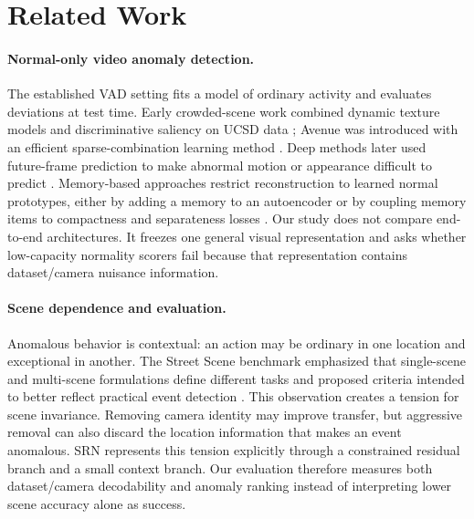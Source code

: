 \section{Related Work}

\paragraph{Normal-only video anomaly detection.}
The established VAD setting fits a model of ordinary activity and evaluates deviations at test time. Early crowded-scene work combined dynamic texture models and discriminative saliency on UCSD data \citep{li2014anomaly}; Avenue was introduced with an efficient sparse-combination learning method \citep{lu2013abnormal}. Deep methods later used future-frame prediction to make abnormal motion or appearance difficult to predict \citep{liu2018future}. Memory-based approaches restrict reconstruction to learned normal prototypes, either by adding a memory to an autoencoder \citep{gong2019memorizing} or by coupling memory items to compactness and separateness losses \citep{park2020memory}. Our study does not compare end-to-end architectures. It freezes one general visual representation and asks whether low-capacity normality scorers fail because that representation contains dataset/camera nuisance information.

\paragraph{Scene dependence and evaluation.}
Anomalous behavior is contextual: an action may be ordinary in one location and exceptional in another. The Street Scene benchmark emphasized that single-scene and multi-scene formulations define different tasks and proposed criteria intended to better reflect practical event detection \citep{ramachandra2020street}. This observation creates a tension for scene invariance. Removing camera identity may improve transfer, but aggressive removal can also discard the location information that makes an event anomalous. SRN represents this tension explicitly through a constrained residual branch and a small context branch. Our evaluation therefore measures both dataset/camera decodability and anomaly ranking instead of interpreting lower scene accuracy alone as success.

